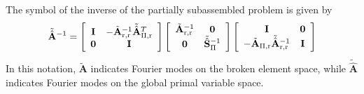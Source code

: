 \documentclass[review]{siamart190516}
\begin{document}
\begin{definition}
The symbol of the inverse of the partially subassembled problem is given by
\begin{equation}
\tilde{\hat{\mathbf{A}}}^{-1} =
\left[ \begin{array}{c c}
\mathbf{I}  &  -\tilde{\mathbf{A}}_{\text{r}, \text{r}}^{-1} \tilde{\hat{\mathbf{A}}}_{\Pi, \text{r}}^T  \\
\mathbf{0}  &  \mathbf{I}                                                                                                                             \\
\end{array} \right]
\left[ \begin{array}{c c}
\tilde{\mathbf{A}}_{\text{r}, \text{r}}^{-1}  &  \mathbf{0}                                        \\
\mathbf{0}                                                    &  \tilde{\hat{\mathbf{S}}}_{\Pi}^{-1}  \\
\end{array} \right]
\left[ \begin{array}{c c}
\mathbf{I}                                                                                                                           &  \mathbf{0}  \\
-\tilde{\mathbf{A}}_{\Pi, \text{r}} \tilde{\hat{\mathbf{A}}}_{\text{r}, \text{r}}^{-1}  &  \mathbf{I}  \\
\end{array} \right]
\end{equation}
In this notation, $\tilde{\mathbf{A}}$ indicates Fourier modes on the broken element space, while $\tilde{\hat{\mathbf{A}}}$ indicates Fourier modes on the global primal variable space.


\end{definition}
\end{document}
